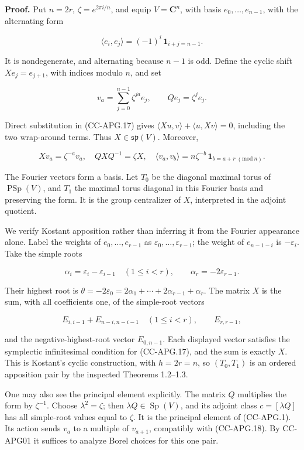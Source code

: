 \textbf{Proof.} Put \(n=2r\), \(\zeta=e^{2\pi i/n}\), and equip
\(V=\mathbf C^n\), with basis \(e_0,\ldots,e_{n-1}\), with the
alternating form

\[
 \langle e_i,e_j\rangle=(-1)^i\,\mathbf 1_{i+j=n-1}.
 \tag{CC-APG.17}
\]

It is nondegenerate, and alternating because \(n-1\) is odd. Define the
cyclic shift \(X e_j=e_{j+1}\), with indices modulo \(n\), and set

\[
 v_a=\sum_{j=0}^{n-1}\zeta^{ja}e_j,\qquad
 Qe_j=\zeta^j e_j.
\]

Direct substitution in (CC-APG.17) gives
\(\langle Xu,v\rangle+\langle u,Xv\rangle=0\), including the two
wrap-around terms. Thus \(X\in\mathfrak{sp}(V)\). Moreover,

\[
 Xv_a=\zeta^{-a}v_a,\quad
 QXQ^{-1}=\zeta X,\quad
 \langle v_a,v_b\rangle
   =n\zeta^{-b}\,\mathbf 1_{b=a+r\;(\mathrm{mod}\ n)}.
 \tag{CC-APG.18}
\]

The Fourier vectors form a basis. Let \(T_0\) be the diagonal maximal
torus of \(\operatorname{PSp}(V)\), and \(T_1\) the maximal torus
diagonal in this Fourier basis and preserving the form. It is the group
centralizer of \(X\), interpreted in the adjoint quotient.

We verify Kostant apposition rather than inferring it from the Fourier
appearance alone. Label the weights of \(e_0,\ldots,e_{r-1}\) as
\(\varepsilon_0,\ldots,\varepsilon_{r-1}\); the weight of \(e_{n-1-i}\)
is \(-\varepsilon_i\). Take the simple roots

\[
 \alpha_i=\varepsilon_i-\varepsilon_{i-1}\quad(1\leq i<r),
 \qquad \alpha_r=-2\varepsilon_{r-1}.
\]

Their highest root is \(\theta=-2\varepsilon_0
=2\alpha_1+\cdots+2\alpha_{r-1}+\alpha_r\). The matrix \(X\) is the sum,
with all coefficients one, of the simple-root vectors

\[
 E_{i,i-1}+E_{n-i,n-i-1}\quad(1\leq i<r),
 \qquad E_{r,r-1},
\]

and the negative-highest-root vector \(E_{0,n-1}\). Each displayed
vector satisfies the symplectic infinitesimal condition for (CC-APG.17),
and the sum is exactly \(X\). This is Kostant's cyclic construction,
with \(h=2r=n\), so \((T_0,T_1)\) is an ordered apposition pair by the
inspected Theorems 1.2--1.3.

One may also see the principal element explicitly. The matrix \(Q\)
multiplies the form by \(\zeta^{-1}\). Choose \(\lambda^2=\zeta\); then
\(\lambda Q\in\operatorname{Sp}(V)\), and its adjoint class
\(c=[\lambda Q]\) has all simple-root values equal to \(\zeta\). It is
the principal element of (CC-APG.1). Its action sends \(v_a\) to a
multiple of \(v_{a+1}\), compatibly with (CC-APG.18). By CC-APG01 it
suffices to analyze Borel choices for this one pair.

